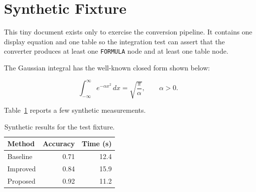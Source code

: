 \documentclass[11pt]{article}
\begin{document}
\section*{Synthetic Fixture}

This tiny document exists only to exercise the conversion pipeline. It contains
one display equation and one table so the integration test can assert that the
converter produces at least one \texttt{FORMULA} node and at least one table node.

The Gaussian integral has the well-known closed form shown below:

\begin{equation}
\int_{-\infty}^{\infty} e^{-\alpha x^{2}} \, dx
  = \sqrt{\frac{\pi}{\alpha}}, \qquad \alpha > 0 .
\end{equation}

Table~\ref{tab:results} reports a few synthetic measurements.

\begin{table}[h]
\centering
\begin{tabular}{lrr}
\toprule
Method & Accuracy & Time (s) \\
\midrule
Baseline & 0.71 & 12.4 \\
Improved & 0.84 & 15.9 \\
Proposed & 0.92 & 11.2 \\
\bottomrule
\end{tabular}
\caption{Synthetic results for the test fixture.}
\label{tab:results}
\end{table}
\end{document}
